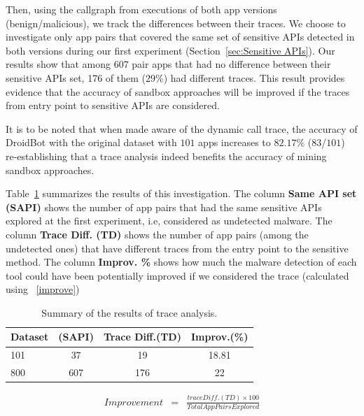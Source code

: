 Then, using the callgraph from executions of both app versions (benign/malicious), we track the differences between their traces. We choose to investigate only app pairs that covered the same set of sensitive APIs detected in both versions during our first experiment (Section~\ref{sec:Sensitive APIs}). Our results show that among $607$ pair apps that had no difference between their sensitive APIs set, 176 of them ($29$\%) had different traces. This result provides evidence that the accuracy of sandbox approaches will be improved if the traces from entry point to sensitive APIs are considered.

It is to be noted that when made aware of the dynamic call trace, the accuracy of DroidBot with the original dataset with $101$ apps increases to $82.17\%$ ($83$/$101$) re-establishing that a trace analysis indeed benefits the accuracy of mining sandbox approaches. %

Table~\ref{tab:pa} summarizes the results of this investigation. The column \textbf{Same API set (SAPI)} shows the number of app pairs that had the same sensitive APIs explored at the first experiment, i.e, considered as undetected malware. The column \textbf{Trace Diff. (TD)} shows the number of app pairs (among the undetected ones) that have different traces from the entry point to the sensitive method. The column \textbf{Improv. \%} shows how much the malware detection of each tool could have been potentially improved if we considered the trace (calculated using ~\eqref{improve})

\begin{table}[ht!]
  \caption{Summary of the results of trace analysis. }
  \centering
  \begin{small}
 \begin{tabular}{lccc}
   \toprule
   Dataset&(SAPI) & Trace Diff.(TD) & Improv.(\%) \\   \midrule
   101 & 37 & 19 & 18.81 \\
   800 & 607 & 176 & 22 \\
 \bottomrule
 \end{tabular}
 \end{small}
 \label{tab:pa}
\end{table}



\begin{eqnarray}
Improvement & = & \frac{trace Diff. (TD) \times 100}{Total App Pairs Explored} 
\label{improve}
\end{eqnarray}


